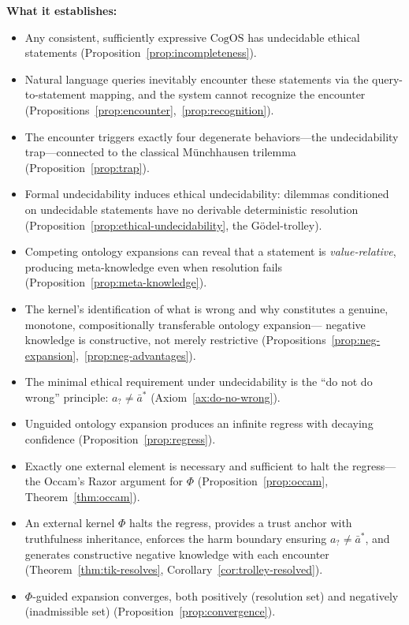 \documentclass[11pt]{article}
\newcommand{\CogOS}{\text{CogOS}}
\begin{document}
\textbf{What it establishes:}
\begin{itemize}
\item Any consistent, sufficiently expressive $\CogOS$ has undecidable
      ethical statements (Proposition~\ref{prop:incompleteness}).
\item Natural language queries inevitably encounter these statements via the
      query-to-statement mapping, and the system cannot recognize the
      encounter (Propositions~\ref{prop:encounter},~\ref{prop:recognition}).
\item The encounter triggers exactly four degenerate behaviors---the
      undecidability trap---connected to the classical M\"{u}nchhausen
      trilemma (Proposition~\ref{prop:trap}).
\item Formal undecidability induces ethical undecidability: dilemmas
      conditioned on undecidable statements have no derivable deterministic
      resolution (Proposition~\ref{prop:ethical-undecidability}, the
      G\"{o}del-trolley).
\item Competing ontology expansions can reveal that a statement is
      \textit{value-relative}, producing meta-knowledge even when resolution
      fails (Proposition~\ref{prop:meta-knowledge}).
\item The kernel's identification of what is wrong and why constitutes a
      genuine, monotone, compositionally transferable ontology expansion---
      negative knowledge is constructive, not merely restrictive
      (Propositions~\ref{prop:neg-expansion},~\ref{prop:neg-advantages}).
\item The minimal ethical requirement under undecidability is the ``do not
      do wrong'' principle: $a_? \neq \bar{a}^*$
      (Axiom~\ref{ax:do-no-wrong}).
\item Unguided ontology expansion produces an infinite regress with decaying
      confidence (Proposition~\ref{prop:regress}).
\item Exactly one external element is necessary and sufficient to halt the
      regress---the Occam's Razor argument for $\Phi$
      (Proposition~\ref{prop:occam}, Theorem~\ref{thm:occam}).
\item An external kernel $\Phi$ halts the regress, provides a trust anchor
      with truthfulness inheritance, enforces the harm boundary ensuring
      $a_? \neq \bar{a}^*$, and generates constructive negative knowledge
      with each encounter (Theorem~\ref{thm:tik-resolves},
      Corollary~\ref{cor:trolley-resolved}).
\item $\Phi$-guided expansion converges, both positively (resolution set)
      and negatively (inadmissible set)
      (Proposition~\ref{prop:convergence}).
\end{itemize}
\end{document}
